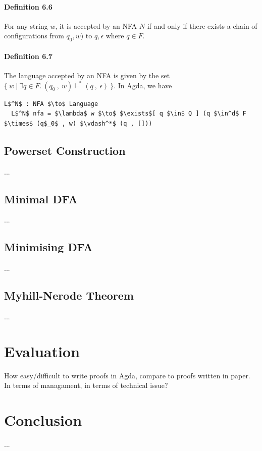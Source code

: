 \documentclass[twoside,openright,final]{bhamthesis}
\begin{document}
\paragraph{Definition 6.6} For any string \(w\), it is accepted by an NFA \(N\)
if and only if there exists a chain of configurations from \(q_0 ,
w)\) to \(q , \epsilon\) where \(q \in F\). 

\paragraph{Definition 6.7} The language accepted by an
NFA is given by the set \(\{\ w\ |\ \exists q\in F.\ (q_0\ ,\
w) \vdash^* (q\ ,\ \epsilon)\ \}\). In Agda, we have
\begin{lstlisting}[mathescape=true,aboveskip=0pt]
  L$^N$ : NFA $\to$ Language
  L$^N$ nfa = $\lambda$ w $\to$ $\exists$[ q $\in$ Q ] (q $\in^d$ F $\times$ (q$_0$ , w) $\vdash^*$ (q , []))
\end{lstlisting} 

\subsection{Powerset Construction}
\par ...

\subsection{Minimal DFA}
\par ...

\subsection{Minimising DFA}
\par ...

\subsection{Myhill-Nerode Theorem}
\par ...

\newpage
\section{Evaluation}
\par How easy/difficult to write proofs in Agda, compare to proofs written
in paper. In terms of managament, in terms of technical issue?

\newpage
\section{Conclusion}
\par ...
\end{document}
